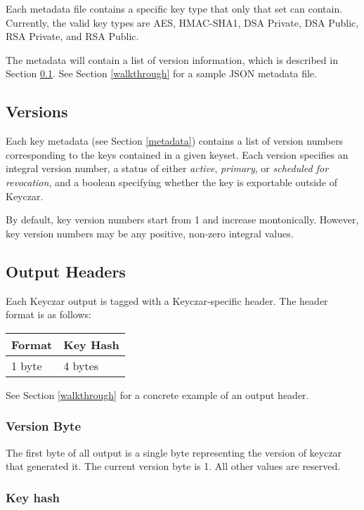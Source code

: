 \documentclass{llncs}
\begin{document}
Each metadata file contains a specific key type that only that set can contain.
Currently, the valid key types are AES, HMAC-SHA1, DSA Private, DSA Public, RSA
Private, and RSA Public.

The metadata will contain a list of version information, which is
described in Section \ref{versions}. See Section \ref{walkthrough} for a sample
JSON metadata file.

\subsection{Versions}\label{versions}

Each key metadata (see Section \ref{metadata}) contains a list of version
numbers corresponding to the keys contained in a given keyset. Each version
specifies an integral version number, a status of either {\it active}, {\it
primary}, or {\it scheduled for revocation}, and a boolean specifying whether
the key is exportable outside of Keyczar.

By default, key version numbers start from 1 and increase montonically.
However, key version numbers may be any positive, non-zero integral values.

\subsection{Output Headers} \label{header}

Each Keyczar output is tagged with a Keyczar-specific header. The header format
is as follows:

\vspace*{3mm}
\begin{tabular}{| l | l |}
\hline
Format & Key Hash \\ \hline
1 byte & 4 bytes \\ \hline
\end{tabular}
\vspace*{3mm}

See Section \ref{walkthrough} for a concrete example of an output header.

\subsubsection{Version Byte}

The first byte of all output is a single byte representing the version of
keyczar that generated it. The current version byte is 1. All other values are
reserved.

\subsubsection{Key hash}\label{keyhash}
\end{document}
